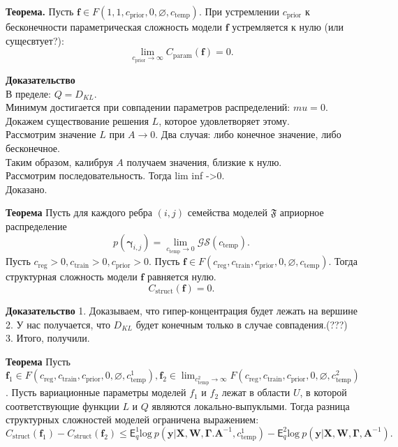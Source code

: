 \textbf{Теорема.}
Пусть $\mathbf{f} \in F(1, 1, c_{\text{prior}}, 0, \varnothing,  c_{\text{temp}} )$.
При устремлении $ c_{\text{prior}}$ к бесконечности параметрическая сложность модели $\mathbf{f}$ устремляется к нулю (или сущесвтует?):
\[
    \lim_{c_{\text{prior}} \to \infty} C_{\text{param}}(\mathbf{f}) = 0.
\]

\textbf{Доказательство}\\
В пределе: $Q = D_{KL}.$\\
Минимум достигается при совпадении параметров распределений: $mu = 0$.\\
Докажем существование решения $L$, которое удовлетворяет этому.\\
Рассмотрим значение $L$ при $A \to 0$. Два случая: либо конечное значение, либо бесконечное.\\
Таким образом, калибруя $A$ получаем значения, близкие к нулю. \\
Рассмотрим последовательность. Тогда lim inf ->0.\\
Доказано. 


\textbf{Теорема}
Пусть для каждого ребра $(i,j)$ семейства моделей $\mathfrak{F}$ априорное распределение $$p(\boldsymbol{\gamma}_{i,j}) =  \lim_{c_{\text{temp}} \to 0} \mathcal{GS}(c_{\text{temp}}).$$
Пусть $c_{\text{reg}} >0, c_{\text{train}} >0, c_{\text{prior}}>0$.
Пусть $\mathbf{f} \in F(c_{\text{reg}}, c_{\text{train}}, c_{\text{prior}}, 0, \varnothing, c_{\text{temp}})$.
Тогда структурная сложность модели $\mathbf{f}$ равняется нулю.
\[
    C_\text{struct}(\mathbf{f}) = 0.
\]
    
\textbf{Доказательство}
1. Доказываем, что гипер-концентрация будет лежать на вершине\\
2. У нас получается, что $D_{KL}$ будет конечным только в случае совпадения.(???)
3. Итого, получили.

\textbf{Теорема}
Пусть $\mathbf{f}_1 \in F(c_{\text{reg}}, c_{\text{train}},  c_{\text{prior}}, 0, \varnothing,  c^1_{\text{temp}}), \mathbf{f}_2   \in \lim_{c^2_{\text{temp}} \to \infty} F(c_{\text{reg}}, c_{\text{train}},  c_{\text{prior}}, 0, \varnothing,  c^2_{\text{temp}})$.
Пусть вариационные параметры моделей $f_1$ и $f_2$ лежат в области $U$, в которой соответствующие функции $L$ и $Q$ являются локально-выпуклыми. 
Тогда разница структурных сложностей моделей ограничена выражением:
\[
    C_\text{struct}(\mathbf{f}_1)  - C_\text{struct}(\mathbf{f}_2) \leq {\mathsf{E}_q^1 \text{log}~{p(\mathbf{y} | \mathbf{X}, \mathbf{W}, \boldsymbol{\Gamma}. \mathbf{A}^{-1}, c^1_{\text{temp}})}} - {\mathsf{E}_q^2 \text{log}~{p(\mathbf{y} | \mathbf{X}, \mathbf{W}, \boldsymbol{\Gamma}, \mathbf{A}^{-1})}}.
\]

